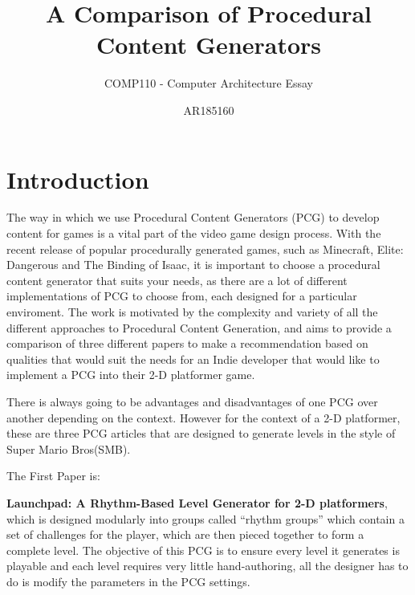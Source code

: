 \documentclass{scrartcl}
\title{A Comparison of Procedural Content Generators}
\subtitle{COMP110 - Computer Architecture Essay}
\author{AR185160}
\begin{document}
\maketitle


\section{Introduction}

The way in which we use Procedural Content Generators (PCG) to develop content for games is a vital part of the video game design process. With the recent release of popular procedurally generated games, such as Minecraft, Elite: Dangerous and The Binding of Isaac, it is important to choose a procedural content generator that suits your needs, as there are a lot of different implementations of PCG to choose from, each designed for a particular enviroment. The work is motivated by the complexity and variety of all the different approaches to Procedural Content Generation, and aims to provide a comparison of three different papers to make a recommendation based on qualities that would suit the needs for an Indie developer that would like to implement a PCG into their 2-D platformer game.

There is always going to be advantages and disadvantages of one PCG over another depending on the context. However for the context of a 2-D platformer, these are three PCG articles that are designed to generate levels in the style of Super Mario Bros(SMB).

The First Paper is:

\textbf{Launchpad: A Rhythm-Based Level Generator for 2-D platformers}\cite{smith2009}, which is designed modularly into groups called ``rhythm groups'' which contain a set of challenges for the player, which are then pieced together to form a complete level. The objective of this PCG is to ensure every level it generates is playable and each level requires very little hand-authoring, all the designer has to do is modify the parameters in the PCG settings.
\end{document}
